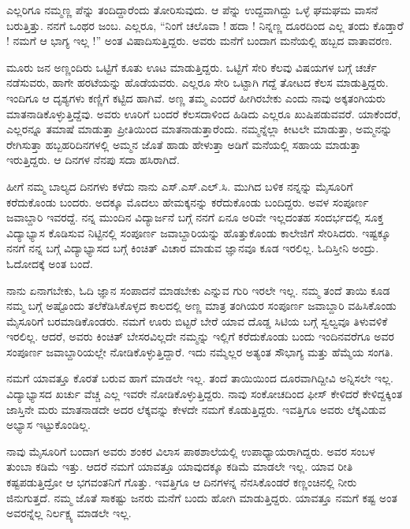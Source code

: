 {ಎಲ್ಲರಿಗೂ ನಮ್ಮಣ್ಣ ಪೆನ್ನು ತಂದಿದ್ದಾರೆಂದು ತೋರಿಸುವುದು. ಆ ಪೆನ್ನು ಉದ್ದವಾಗಿದ್ದು ಒಳ್ಳೆ ಘಮಘಮ ವಾಸನೆ ಬರುತ್ತಿತ್ತು.  ನನಗೆ ಒಂಥರ ಜಂಬ. ಎಲ್ಲರೂ, “ನಿಂಗೆ ಚಲೊವಾ ! ಹದಾ ! ನಿನ್ನಣ್ಣ ದೂರದಿಂದ ಎಲ್ಲ ತಂದು ಕೊಡ್ತಾರೆ ! ನಮಗೆ ಆ ಭಾಗ್ಯ ಇಲ್ಲ !” ಅಂತ ವಿಷಾದಿಸುತ್ತಿದ್ದರು.  ಅವರು ಮನೆಗೆ ಬಂದಾಗ  ಮನೆಯಲ್ಲಿ ಹಬ್ಬದ ವಾತಾವರಣ.  

ಮೂರು ಜನ ಅಣ್ಣಂದಿರು ಒಟ್ಟಿಗೆ ಕೂತು ಊಟ ಮಾಡುತ್ತಿದ್ದರು. ಒಟ್ಟಿಗೆ ಸೇರಿ ಕೆಲವು ವಿಷಯಗಳ ಬಗ್ಗೆ ಚರ್ಚೆ ನಡೆಸುವರು, ಹಾಗೇ ಹರಟೆಯನ್ನು ಹೊಡೆಯವರು.  ಎಲ್ಲರೂ ಸೇರಿ ಒಟ್ಟಾಗಿ ಗದ್ದೆ ತೋಟದ ಕೆಲಸ ಮಾಡುತ್ತಿದ್ದರು. ಇಂದಿಗೂ ಆ ದೃಶ್ಯಗಳು ಕಣ್ಣಿಗೆ ಕಟ್ಟಿದ ಹಾಗಿವೆ.  ಅಣ್ಣ ತಮ್ಮ ಎಂದರೆ ಹೀಗಿರಬೇಕು ಎಂದು ನಾವು ಅಕ್ಕತಂಗಿಯರು ಮಾತನಾಡಿಕೊಳ್ಳುತ್ತಿದ್ದೆವು. ಅವರು ಊರಿಗೆ ಬಂದರೆ ಕೆಲಸದಾಳಿಂದ ಹಿಡಿದು ಎಲ್ಲರೂ ಖುಷಿಪಡುವವರೆ. ಯಾಕೆಂದರೆ, ಎಲ್ಲರನ್ನೂ ತಮಾಷೆ ಮಾಡುತ್ತಾ ಪ್ರೀತಿಯಿಂದ ಮಾತನಾಡುತ್ತಾರೆಂದು.  ನಮ್ಮನ್ನೆಲ್ಲಾ ಕೀಟಲೇ ಮಾಡುತ್ತಾ, ಅಮ್ಮನನ್ನು ರೇಗಿಸುತ್ತಾ ಹಬ್ಬಹರಿದಿನಗಳಲ್ಲಿ ಅಮ್ಮನ ಜೊತೆ ಹಾಡು ಹೇಳುತ್ತಾ ಅಡಿಗೆ ಮನೆಯಲ್ಲಿ ಸಹಾಯ ಮಾಡುತ್ತಾ ಇರುತ್ತಿದ್ದರು.  ಆ ದಿನಗಳ ನೆನಪು ಸದಾ ಹಸಿರಾಗಿದೆ.

ಹೀಗೆ ನಮ್ಮ ಬಾಲ್ಯದ ದಿನಗಳು ಕಳೆದು ನಾನು ಎಸ್.ಎಸ್.ಎಲ್.ಸಿ. ಮುಗಿದ ಬಳಿಕ ನನ್ನನ್ನು ಮೈಸೂರಿಗೆ ಕರೆದುಕೊಂಡು ಬಂದರು. ಅದಕ್ಕೂ ಮೊದಲು ಹೇಮಕ್ಕನನ್ನು ಕರೆದುಕೊಂಡು ಬಂದಿದ್ದರು. ಅವಳ ಸಂಪೂರ್ಣ ಜವಾಬ್ದಾರಿ ಇವರದ್ದೆ.  ನನ್ನ ಮುಂದಿನ ವಿದ್ಯಾರ್ಜನೆ ಬಗ್ಗೆ ನನಗೆ ಏನೂ ಅರಿವೇ ಇಲ್ಲದಂತಹ ಸಂದರ್ಭದಲ್ಲಿ ಸೂಕ್ತ ವಿದ್ಯಾಭ್ಯಾಸ ಕೊಡಿಸುವ ನಿಟ್ಟಿನಲ್ಲಿ  ಸಂಪೂರ್ಣ  ಜವಾಬ್ದಾರಿಯನ್ನು ಹೊತ್ತುಕೊಂಡು ಕಾಲೇಜಿಗೆ ಸೇರಿಸಿದರು. ಇಷ್ಟಕ್ಕೂ ನನಗೆ ನನ್ನ ಬಗ್ಗೆ ವಿದ್ಯಾಭ್ಯಾಸದ ಬಗ್ಗೆ ಕಿಂಚಿತ್ ವಿಚಾರ ಮಾಡುವ ಜ್ಞಾನವೂ ಕೂಡ ಇರಲಿಲ್ಲ. ಓದಿಸ್ತೀನಿ ಅಂದ್ರು. ಓದೋದಕ್ಕೆ ಅಂತ ಬಂದೆ. 

ನಾನು ಏನಾಗಬೇಕು, ಓದಿ ಜ್ಞಾನ ಸಂಪಾದನೆ ಮಾಡಬೇಕು ಎನ್ನುವ ಗುರಿ ಇರಲೇ ಇಲ್ಲ. ನಮ್ಮ ತಂದೆ ತಾಯಿ ಕೂಡ ನಮ್ಮ ಬಗ್ಗೆ ಅಷ್ಟೊಂದು ತಲೆಕೆಡಿಸಿಕೊಳ್ಳದ ಕಾಲದಲ್ಲಿ ಅಣ್ಣ ಮಾತ್ರ ತಂಗಿಯರ ಸಂಪೂರ್ಣ ಜವಾಬ್ದಾರಿ ವಹಿಸಿಕೊಂಡು ಮೈಸೂರಿಗೆ ಬರಮಾಡಿಕೊಂಡರು.  ನಮಗೆ ಊರು ಬಿಟ್ಟರೆ ಬೇರೆ ಯಾವ ದೊಡ್ಡ ಸಿಟಿಯ ಬಗ್ಗೆ ಸ್ವಲ್ವವೂ ತಿಳುವಳಿಕೆ ಇರಲಿಲ್ಲ. ಆದರೆ, ಅವರು ಕಿಂಚಿತ್ ಬೇಸರವಿಲ್ಲದೇ ನಮ್ಮನ್ನು ಇಲ್ಲಿಗೆ ಕರೆದುಕೊಂಡು ಬಂದು ಇಂದಿನವರೆಗೂ ಅವರ ಸಂಪೂರ್ಣ ಜವಾಬ್ದಾರಿಯಲ್ಲೇ ನೋಡಿಕೊಳ್ಳುತ್ತಿದ್ದಾರೆ.  ಇದು ನಮ್ಮೆಲ್ಲರ ಅತ್ಯಂತ ಸೌಭಾಗ್ಯ ಮತ್ತು ಹೆಮ್ಮೆಯ ಸಂಗತಿ. 

ನಮಗೆ ಯಾವತ್ತೂ ಕೊರತೆ ಬರುವ ಹಾಗೆ ಮಾಡಲೇ ಇಲ್ಲ. ತಂದೆ   \enginline{-}   ತಾಯಿಯಿಂದ ದೂರವಾಗಿದ್ದೀವಿ ಅನ್ನಿಸಲೇ ಇಲ್ಲ. ವಿದ್ಯಾಭ್ಯಾಸದ ಖರ್ಚು ವೆಚ್ಚ ಎಲ್ಲ ಇವರೇ ನೋಡಿಕೊಳ್ಳುತ್ತಿದ್ದರು.  ನಾವು ಸಂಕೋಚದಿಂದ ಫೀಸ್ ಕೇಳಿದರೆ ಕೇಳಿದ್ದಕ್ಕಿಂತ ಜಾಸ್ತಿನೇ ಮರು ಮಾತನಾಡದೇ ಅದರ ಲೆಕ್ಕವನ್ನು ಕೇಳದೇ ನಮಗೆ ಕೊಡುತ್ತಿದ್ದರು.  ಇವತ್ತಿಗೂ ಅವರು ಲೆಕ್ಕವಿಡುವ ಅಭ್ಯಾಸ ಇಟ್ಟುಕೊಂಡಿಲ್ಲ.

ನಾವು ಮೈಸೂರಿಗೆ ಬಂದಾಗ ಅವರು ಶಂಕರ ವಿಲಾಸ  ಪಾಠಶಾಲೆಯಲ್ಲಿ ಉಪಾಧ್ಯಾಯರಾಗಿದ್ದರು.  ಅವರ ಸಂಬಳ ತುಂಬಾ ಕಡಿಮೆ ಇತ್ತು. ಆದರೆ ನಮಗೆ ಯಾವತ್ತೂ ಯಾವುದಕ್ಕೂ ಕಡಿಮೆ ಮಾಡಲೇ ಇಲ್ಲ.  ಯಾವ ರೀತಿ ಕಷ್ಟಪಡುತ್ತಿದ್ರೋ ಆ ಭಗವಂತನಿಗೆ ಗೊತ್ತು.  ಇವತ್ತಿಗೂ ಆ ದಿನಗಳನ್ನ ನೆನಸಿಕೊಂಡರೆ ಕಣ್ಣಂಚಿನಲ್ಲಿ ನೀರು ಜಿನುಗುತ್ತದೆ. ನಮ್ಮ ಜೊತೆ ಸಾಕಷ್ಟು ಜನರು ಮನೆಗೆ ಬಂದು   \enginline{-}   ಹೋಗಿ ಮಾಡುತ್ತಿದ್ದರು. ಯಾವತ್ತೂ ನಮಗೆ ಕಷ್ಟ ಅಂತ ಅವರನ್ನೆಲ್ಲ ನಿರ್ಲಕ್ಷ್ಯ ಮಾಡಲೇ ಇಲ್ಲ.

}
